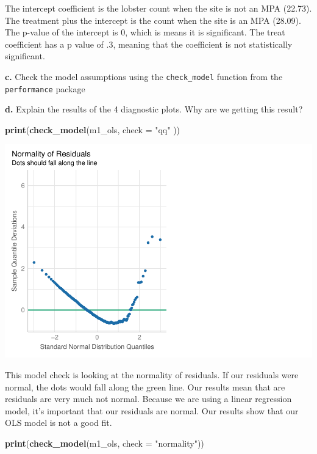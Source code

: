 \documentclass[
]{article}
\newenvironment{Shaded}{\begin{snugshade}}{\end{snugshade}}
\newcommand{\AttributeTok}[1]{\textcolor[rgb]{0.13,0.29,0.53}{#1}}
\newcommand{\FunctionTok}[1]{\textcolor[rgb]{0.13,0.29,0.53}{\textbf{#1}}}
\newcommand{\NormalTok}[1]{#1}
\newcommand{\StringTok}[1]{\textcolor[rgb]{0.31,0.60,0.02}{#1}}
\begin{document}
The intercept coefficient is the lobster count when the site is not an
MPA (22.73). The treatment plus the intercept is the count when the site
is an MPA (28.09). The p-value of the intercept is 0, which is means it
is significant. The treat coefficient has a p value of .3, meaning that
the coefficient is not statistically significant.

\textbf{c.} Check the model assumptions using the \texttt{check\_model}
function from the \texttt{performance} package

\textbf{d.} Explain the results of the 4 diagnostic plots. Why are we
getting this result?

\begin{Shaded}
\begin{Highlighting}[]
\FunctionTok{print}\NormalTok{(}\FunctionTok{check\_model}\NormalTok{(m1\_ols,  }\AttributeTok{check =} \StringTok{"qq"}\NormalTok{ ))}
\end{Highlighting}
\end{Shaded}

\includegraphics{hw1-lobstrs-eds241_files/figure-latex/unnamed-chunk-8-1.pdf}

This model check is looking at the normality of residuals. If our
residuals were normal, the dots would fall along the green line. Our
results mean that are residuals are very much not normal. Because we are
using a linear regression model, it's important that our residuals are
normal. Our results show that our OLS model is not a good fit.

\begin{Shaded}
\begin{Highlighting}[]
\FunctionTok{print}\NormalTok{(}\FunctionTok{check\_model}\NormalTok{(m1\_ols, }\AttributeTok{check =} \StringTok{"normality"}\NormalTok{))}
\end{Highlighting}
\end{Shaded}
\end{document}
